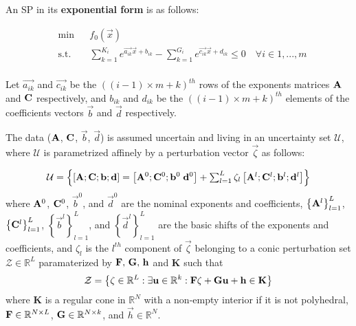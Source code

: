 An SP in its \textbf{exponential form} is as follows:

\begin{equation}
    \label{SP_exponential}
\begin{aligned}
	& \min && f_0\left(\vec{x}\right) \\
	& \text{s.t.} && \textstyle{\sum}_{k=1}^{K_i}e^{\vec{a_{ik}}\vec{x} + b_{ik}} - \textstyle{\sum}_{k=1}^{G_i}e^{\vec{c_{ik}}\vec{x} + d_{ik}} \leq 0 \quad \forall i \in 1,...,m\\
\end{aligned}
\end{equation}

Let $\vec{a_{ik}}$ and $\vec{c_{ik}}$ be the $((i-1)\times m + k)^{th}$ rows of the exponents matrices $\mathbf{A}$ and $\mathbf{C}$ respectively, and $b_{ik}$ and $d_{ik}$ be the $((i-1)\times m + k)^{th}$ elements of the coefficients vectors $\vec{b}$ and $\vec{d}$ respectively.

The data ($\mathbf{A}$, $\mathbf{C}$, $\vec{b}$, $\vec{d}$) is assumed uncertain and living in an uncertainty set $\mathcal{U}$, where $\mathcal{U}$ is parametrized affinely by a perturbation vector $\vec{\zeta}$ as follows:

\begin{equation}
\mathcal{U} = \left\{\left[\mathbf{A};\mathbf{C};\mathbf{b};\mathbf{d}\right] = \left[\mathbf{A}^0;\mathbf{C}^0;\mathbf{b}^0\;\mathbf{d}^0 \right] + \textstyle{\sum_{l=1}^{L}\zeta_l\left[\mathbf{A}^l;\mathbf{C}^l;\mathbf{b}^l; \mathbf{d}^l\right]}\right\}
\label{Data}
\end{equation}
where $\mathbf{A}^0$, $\mathbf{C}^0$, $\vec{b}^0$, and $\vec{d}^0$ are the nominal exponents and coefficients, $\left\{\mathbf{A}^l\right\}_{l=1}^{L}$, $\left\{\mathbf{C}^l\right\}_{l=1}^{L}$, $\left\{\vec{b}^l\right\}_{l=1}^{L}$, and $\left\{\vec{d}^l\right\}_{l=1}^{L}$ are the basic shifts of the exponents and coefficients, and $\zeta_l$ is the $l^{th}$ component of $\vec{\zeta}$ belonging to a conic perturbation set $\mathcal{Z} \in \mathbb{R}^L$ paramaterized by $\mathbf{F},\,\mathbf{G},\,\mathbf{h}$ and $\textbf{K}$ such that
\begin{equation}
\mathcal{Z} = \left\{ \mathbf{\zeta} \in \mathbb{R}^L: \exists \mathbf{u} \in \mathbb{R}^k:\mathbf{F}\mathbf{\zeta} + \mathbf{G}\mathbf{u} + \mathbf{h} \in \textbf{K} \right\}
\label{perturbation_set}
\end{equation}
where $\mathbf{K}$ is a regular cone in $\mathbb{R}^N$ with a non-empty interior
if it is not polyhedral, $\mathbf{F} \in \mathbb{R}^{N \times L}$, $\mathbf{G} \in \mathbb{R}^{N \times k}$,
and $\vec{h} \in \mathbb{R}^{N}$.


